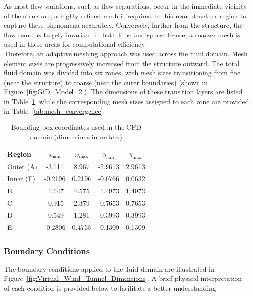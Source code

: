 \documentclass[../main]{subfiles}
\begin{document}
As most flow variations, such as flow separations, occur in the immediate vicinity of the structure, a highly 
refined mesh is required in this near-structure region to capture these phenomena accurately. 
Conversely, farther from the structure, the flow remains largely invariant in both time and space. Hence, a coarser mesh 
is used in these areas for computational efficiency. \\

Therefore, an adaptive meshing approach was used across the fluid domain. 
Mesh element sizes are progressively increased from the structure outward. The total fluid domain was divided 
into six zones, with mesh sizes transitioning from fine (near the structure) to coarse (near the outer boundaries)  
(shown in Figure~\ref{fig:GiD_Model_2}). The dimensions of these transition layers are listed in 
Table~\ref{tab:bounding_boxes}, while the corresponding mesh sizes assigned to each zone are provided in 
Table~\ref{tab:mesh_convergence}. \\

\begin{table}[h!]
\centering
\caption{Bounding box coordinates used in the CFD domain (dimensions in meters)}
\begin{tabular}{|l|c|c|c|c|}
\hline
\textbf{Region} & $x_{\min}$ & $x_{\max}$ & $y_{\min}$ & $y_{\max}$ \\
\hline
Outer (A) & -3.111  & 8.967  & -2.9613 & 2.9613 \\
\hline
Inner (F) & -0.2196 & 0.2196 & -0.0766 & 0.0632 \\
\hline
B         & -1.647  & 4.575  & -1.4973 & 1.4973 \\
\hline
C         & -0.915  & 2.379  & -0.7653 & 0.7653 \\
\hline
D         & -0.549  & 1.281  & -0.3993 & 0.3993 \\
\hline
E         & -0.2806 & 0.4758 & -0.1309 & 0.1309 \\
\hline
\end{tabular}
\label{tab:bounding_boxes}
\end{table}

\subsubsection{Boundary Conditions}
The boundary conditions applied to the fluid domain are illustrated in Figure~\ref{fig:Virtual_Wind_Tunnel_Dimensions}. 
A brief physical interpretation of each condition is provided below to facilitate a better understanding. \\
\end{document}
